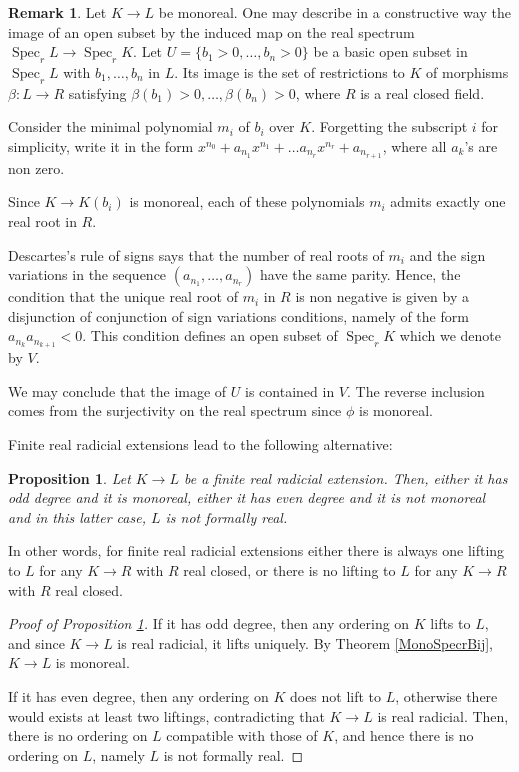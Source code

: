\documentclass[12pt]{amsart}
\newtheorem{prop}[thm]{Proposition}
\theoremstyle{definition}
\newtheorem{rem}[thm]{Remark}
\DeclareMathOperator{\Sp}{Spec}
\begin{document}
\begin{rem}
Let $K\to L$ be monoreal. One may describe in a constructive way the image of an open subset by the induced map on the real spectrum $\Sp_r L\to \Sp_r K$. Let $U=\{b_1>0,\ldots,b_n>0\}$ be a basic open subset in $\Sp_r L$ with $b_1,\ldots,b_n$ in $L$.
Its image is the set of restrictions to $K$ of morphisms $\beta:L\to R$ satisfying $\beta(b_1)>0,\ldots,\beta(b_n)>0$, where $R$ is a real closed field.

Consider the minimal polynomial $m_i$ of $b_i$ over $K$. Forgetting the subscript $i$ for simplicity, write it in the form $x^{n_0}+a_{n_1}x^{n_1}+\ldots a_{n_{r}}x^{n_{r}}+
a_{n_{r+1}}$, where all $a_k$'s are non zero.

Since $K\to K(b_i)$ is monoreal, each of these polynomials $m_i$ admits exactly one real root in $R$.

Descartes's rule of signs says that the number of real roots of $m_i$ and the sign variations in the sequence $(a_{n_1},\ldots,a_{n_r})$ have the same parity. 
Hence, the condition that the unique real root of $m_i$ in $R$ is non negative is given by a disjunction of conjunction of sign variations conditions, namely of the form $a_{n_{k}}a_{n_{k+1}}<0$. This condition defines an open subset of $\Sp_rK$ which we denote by $V$. 

We may conclude that the image of 
$U$ is contained in $V$. The reverse inclusion comes from the surjectivity on the real spectrum since $\phi$ is monoreal.	
\end{rem}


Finite real radicial extensions lead to the following alternative: 
 \begin{prop}\label{FiniteAtMost}
Let $K\to L$ be a finite real radicial extension. Then, either it has odd degree and it is monoreal, either 
it has even degree and it is not monoreal and in this latter case, $L$ is not formally real.  	
 \end{prop}
 
In other words, for finite real radicial extensions either there is always one lifting to $L$ for any $K\to R$ with $R$ real closed, or there is no lifting to $L$ for any $K\to R$ with $R$ real closed.


\begin{proof}[Proof of Proposition \ref{FiniteAtMost}]
If it has odd degree, then any ordering on $K$ lifts to $L$, and since $K\to L$ is real radicial, it lifts uniquely. By Theorem \ref{MonoSpecrBij}, $K\to L$ is monoreal.

If it has even degree, then any ordering on $K$ does not lift to $L$, otherwise there would exists at least two liftings, contradicting that $K\to L$ is real radicial. Then, there is no ordering on $L$ compatible with those of $K$, and hence there is no ordering on $L$, namely $L$ is not formally real.
\end{proof}	
\end{document}
